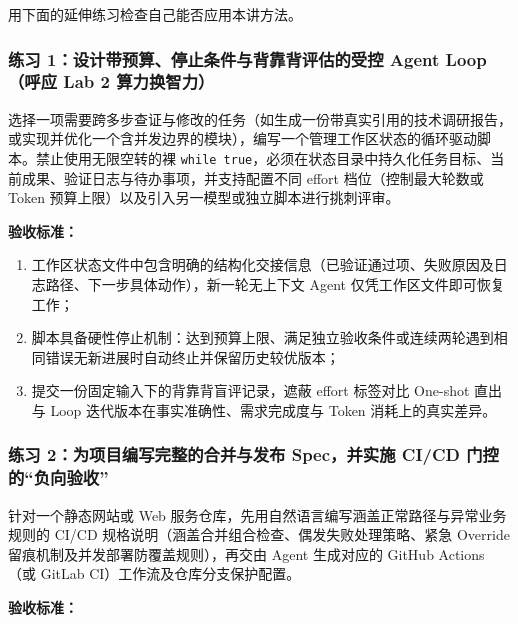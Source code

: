 \documentclass[UTF8,a4paper,11pt,fontset=fandol]{ctexart}
\begin{document}
用下面的延伸练习检查自己能否应用本讲方法。

\subsubsection*{练习 1：设计带预算、停止条件与背靠背评估的受控 Agent Loop（呼应 Lab 2 算力换智力）}

选择一项需要跨多步查证与修改的任务（如生成一份带真实引用的技术调研报告，或实现并优化一个含并发边界的模块），编写一个管理工作区状态的循环驱动脚本。禁止使用无限空转的裸 \texttt{while true}，必须在状态目录中持久化任务目标、当前成果、验证日志与待办事项，并支持配置不同 effort 档位（控制最大轮数或 Token 预算上限）以及引入另一模型或独立脚本进行挑刺评审。

\par{}\textbf{验收标准：}

\begin{enumerate}
\item 工作区状态文件中包含明确的结构化交接信息（已验证通过项、失败原因及日志路径、下一步具体动作），新一轮无上下文 Agent 仅凭工作区文件即可恢复工作；

\item 脚本具备硬性停止机制：达到预算上限、满足独立验收条件或连续两轮遇到相同错误无新进展时自动终止并保留历史较优版本；

\item 提交一份固定输入下的背靠背盲评记录，遮蔽 effort 标签对比 One-shot 直出与 Loop 迭代版本在事实准确性、需求完成度与 Token 消耗上的真实差异。
\end{enumerate}

\subsubsection*{练习 2：为项目编写完整的合并与发布 Spec，并实施 CI/CD 门控的“负向验收”}

针对一个静态网站或 Web 服务仓库，先用自然语言编写涵盖正常路径与异常业务规则的 CI/CD 规格说明（涵盖合并组合检查、偶发失败处理策略、紧急 Override 留痕机制及并发部署防覆盖规则），再交由 Agent 生成对应的 GitHub Actions（或 GitLab CI）工作流及仓库分支保护配置。

\par{}\textbf{验收标准：}
\end{document}
